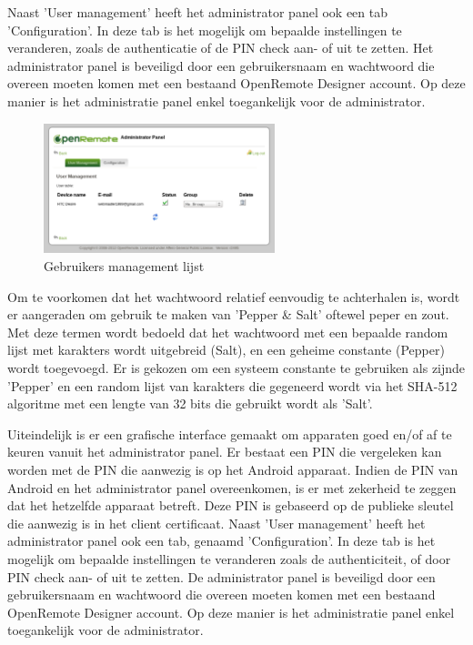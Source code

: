 \documentclass[]{article}
\begin{document}
Naast 'User management' heeft het administrator panel ook een tab
'Configuration'. In deze tab is het mogelijk om bepaalde instellingen te
veranderen, zoals de authenticatie of de PIN check aan- of uit te zetten.  Het
administrator panel is beveiligd door een gebruikersnaam en wachtwoord die
overeen moeten komen met een bestaand OpenRemote Designer account. Op deze manier
is het administratie panel enkel toegankelijk voor de administrator.

\begin{figure}[htpb]
   \begin{center}
     \includegraphics[width=0.6\textwidth]{userlist.pdf}
   \end{center}
   \label{userlist}
   \caption{Gebruikers management lijst}
\end{figure}

Om te voorkomen dat het wachtwoord relatief eenvoudig te achterhalen is, wordt
er aangeraden om gebruik te maken van 'Pepper \& Salt' oftewel peper en zout. Met
deze termen wordt bedoeld dat het wachtwoord met een bepaalde random lijst
met karakters wordt uitgebreid (Salt), en een geheime constante (Pepper) wordt
toegevoegd. Er is gekozen om een systeem constante te gebruiken als zijnde
'Pepper' en een random lijst van karakters die gegeneerd wordt via het SHA-512
algoritme met een lengte van 32 bits die gebruikt wordt als 'Salt'. 

Uiteindelijk is er een grafische interface gemaakt om apparaten goed en/of af te
keuren vanuit het administrator panel. Er bestaat een PIN die vergeleken kan
worden met de PIN die aanwezig is op het Android apparaat. Indien de PIN van
Android en het administrator panel overeenkomen, is er met zekerheid te zeggen
dat het hetzelfde apparaat betreft. Deze PIN is gebaseerd op de publieke sleutel
die aanwezig is in het client certificaat. Naast 'User management' heeft het
administrator panel ook een tab, genaamd 'Configuration'. In deze tab is het
mogelijk om bepaalde instellingen te veranderen zoals de authenticiteit, of door
PIN check aan- of uit te zetten.  De administrator panel is beveiligd door een
gebruikersnaam en wachtwoord die overeen moeten komen met een bestaand
OpenRemote Designer account. Op deze manier is het administratie panel enkel
toegankelijk voor de administrator.
\end{document}
